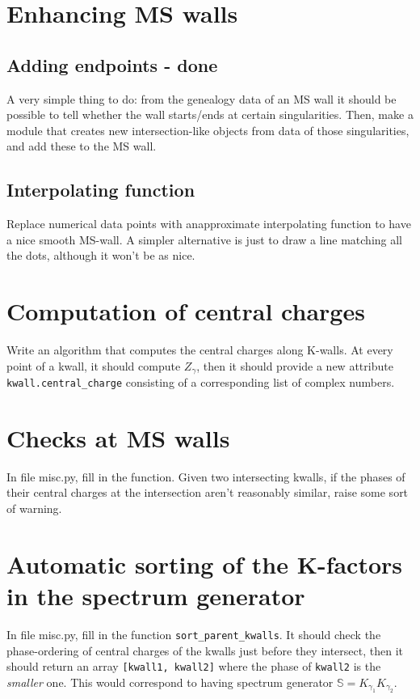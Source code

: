 \documentclass[11pt]{report}
\begin{document}
\section{Enhancing MS walls}\label{sec:bp-to-int}
\subsection{Adding endpoints  - {\color{red} \bf done}}
A very simple thing to do: from the genealogy data of an MS wall it should be possible to tell whether the wall starts/ends at certain singularities. Then, make a module that creates new intersection-like objects from data of those singularities, and add these to the MS wall. 

\subsection{Interpolating function}
Replace numerical data points with anapproximate interpolating function to have a nice smooth MS-wall. A simpler alternative is just to draw a line matching all the dots, although it won't be as nice.



\section{Computation of central charges}
Write an algorithm that computes the central charges along K-walls.
At every point of a kwall, it should compute $Z_{\gamma}$, then it should provide a new attribute {\tt kwall.central\_{charge}} consisting of a corresponding list of complex numbers.




\section{Checks at MS walls}
In file misc.py, fill in the function. Given two intersecting kwalls, if the phases of their central charges at the intersection aren't reasonably similar, raise some sort of warning.



\section{Automatic sorting of the K-factors in the spectrum generator}
In file misc.py, fill in the function {\tt sort\_{parent\_{kwalls}}}. It should check the phase-ordering of central charges of the kwalls just before they intersect, then it should return an array {\tt [kwall1, kwall2]} where the phase of {\tt kwall2} is the \emph{smaller} one. This would correspond to having spectrum generator $\mathbb{S} = K_{\gamma_{1}}K_{\gamma_{2}}$.
\end{document}
